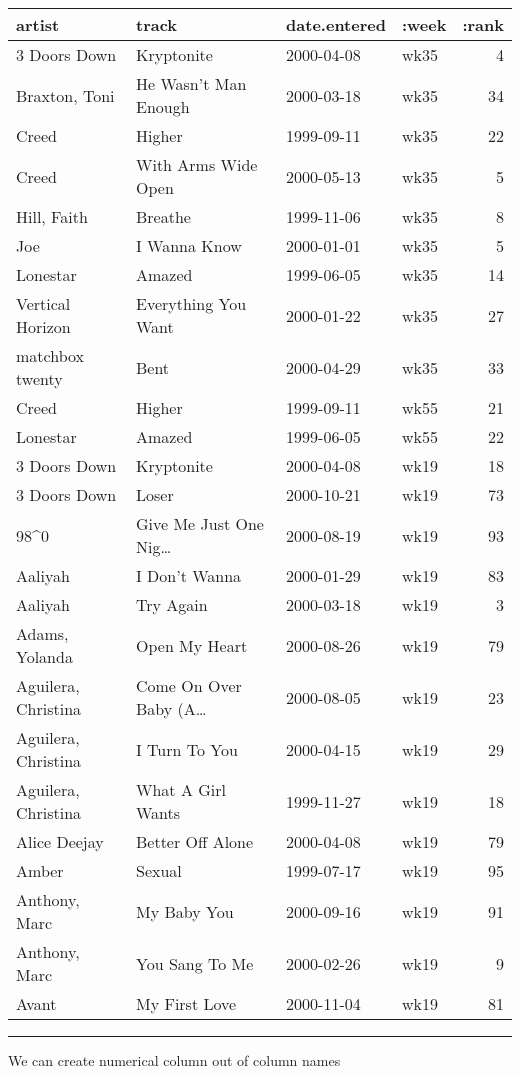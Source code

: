 \documentclass[]{article}
\newenvironment{Shaded}{\begin{snugshade}}{\end{snugshade}}
\newcommand{\StringTok}[1]{\textcolor[rgb]{0.31,0.60,0.02}{#1}}
\newcommand{\SpecialStringTok}[1]{\textcolor[rgb]{0.31,0.60,0.02}{#1}}
\newcommand{\VariableTok}[1]{\textcolor[rgb]{0.00,0.00,0.00}{#1}}
\newcommand{\AttributeTok}[1]{\textcolor[rgb]{0.77,0.63,0.00}{#1}}
\newcommand{\NormalTok}[1]{#1}
\begin{document}
\begin{longtable}[]{@{}llllr@{}}
\toprule
artist & track & date.entered & :week & :rank\tabularnewline
\midrule
\endhead
3 Doors Down & Kryptonite & 2000-04-08 & wk35 & 4\tabularnewline
Braxton, Toni & He Wasn't Man Enough & 2000-03-18 & wk35 &
34\tabularnewline
Creed & Higher & 1999-09-11 & wk35 & 22\tabularnewline
Creed & With Arms Wide Open & 2000-05-13 & wk35 & 5\tabularnewline
Hill, Faith & Breathe & 1999-11-06 & wk35 & 8\tabularnewline
Joe & I Wanna Know & 2000-01-01 & wk35 & 5\tabularnewline
Lonestar & Amazed & 1999-06-05 & wk35 & 14\tabularnewline
Vertical Horizon & Everything You Want & 2000-01-22 & wk35 &
27\tabularnewline
matchbox twenty & Bent & 2000-04-29 & wk35 & 33\tabularnewline
Creed & Higher & 1999-09-11 & wk55 & 21\tabularnewline
Lonestar & Amazed & 1999-06-05 & wk55 & 22\tabularnewline
3 Doors Down & Kryptonite & 2000-04-08 & wk19 & 18\tabularnewline
3 Doors Down & Loser & 2000-10-21 & wk19 & 73\tabularnewline
98\^{}0 & Give Me Just One Nig\ldots{} & 2000-08-19 & wk19 &
93\tabularnewline
Aaliyah & I Don't Wanna & 2000-01-29 & wk19 & 83\tabularnewline
Aaliyah & Try Again & 2000-03-18 & wk19 & 3\tabularnewline
Adams, Yolanda & Open My Heart & 2000-08-26 & wk19 & 79\tabularnewline
Aguilera, Christina & Come On Over Baby (A\ldots{} & 2000-08-05 & wk19 &
23\tabularnewline
Aguilera, Christina & I Turn To You & 2000-04-15 & wk19 &
29\tabularnewline
Aguilera, Christina & What A Girl Wants & 1999-11-27 & wk19 &
18\tabularnewline
Alice Deejay & Better Off Alone & 2000-04-08 & wk19 & 79\tabularnewline
Amber & Sexual & 1999-07-17 & wk19 & 95\tabularnewline
Anthony, Marc & My Baby You & 2000-09-16 & wk19 & 91\tabularnewline
Anthony, Marc & You Sang To Me & 2000-02-26 & wk19 & 9\tabularnewline
Avant & My First Love & 2000-11-04 & wk19 & 81\tabularnewline
\bottomrule
\end{longtable}

\begin{center}\rule{0.5\linewidth}{0.5pt}\end{center}

We can create numerical column out of column names

\begin{Shaded}
\end{Shaded}
\end{document}
